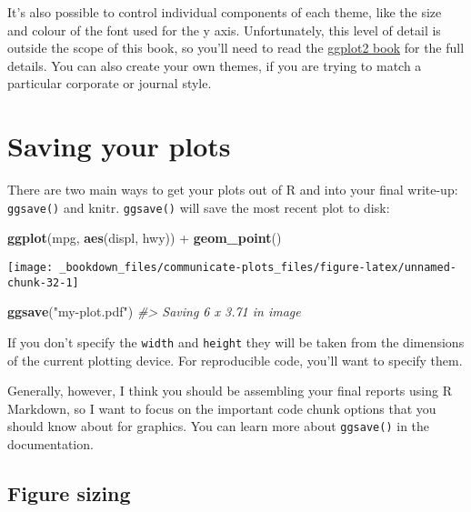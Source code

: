 \documentclass[]{book}
\newenvironment{Shaded}{\begin{snugshade}}{\end{snugshade}}
\newcommand{\KeywordTok}[1]{\textcolor[rgb]{0.13,0.29,0.53}{\textbf{{#1}}}}
\newcommand{\StringTok}[1]{\textcolor[rgb]{0.31,0.60,0.02}{{#1}}}
\newcommand{\CommentTok}[1]{\textcolor[rgb]{0.56,0.35,0.01}{\textit{{#1}}}}
\newcommand{\NormalTok}[1]{{#1}}
\begin{document}
It's also possible to control individual components of each theme, like
the size and colour of the font used for the y axis. Unfortunately, this
level of detail is outside the scope of this book, so you'll need to
read the \href{https://amzn.com/331924275X}{ggplot2 book} for the full
details. You can also create your own themes, if you are trying to match
a particular corporate or journal style.

\hypertarget{saving-your-plots}{\section{Saving your
plots}\label{saving-your-plots}}

There are two main ways to get your plots out of R and into your final
write-up: \texttt{ggsave()} and knitr. \texttt{ggsave()} will save the
most recent plot to disk:

\begin{Shaded}
\begin{Highlighting}[]
\KeywordTok{ggplot}\NormalTok{(mpg, }\KeywordTok{aes}\NormalTok{(displ, hwy)) +}\StringTok{ }\KeywordTok{geom_point}\NormalTok{()}
\end{Highlighting}
\end{Shaded}

\begin{center}\texttt{[image: \_bookdown\_files/communicate-plots\_files/figure-latex/unnamed-chunk-32-1]} \end{center}

\begin{Shaded}
\begin{Highlighting}[]
\KeywordTok{ggsave}\NormalTok{(}\StringTok{"my-plot.pdf"}\NormalTok{)}
\CommentTok{#> Saving 6 x 3.71 in image}
\end{Highlighting}
\end{Shaded}

If you don't specify the \texttt{width} and \texttt{height} they will be
taken from the dimensions of the current plotting device. For
reproducible code, you'll want to specify them.

Generally, however, I think you should be assembling your final reports
using R Markdown, so I want to focus on the important code chunk options
that you should know about for graphics. You can learn more about
\texttt{ggsave()} in the documentation.

\subsection{Figure sizing}\label{figure-sizing}
\end{document}
